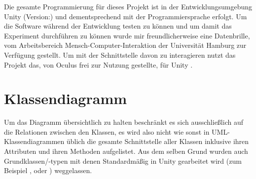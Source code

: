Die gesamte Programmierung für dieses Projekt ist in der Entwicklungsumgebung Unity (Version:) \cite{unity} und dementsprechend mit der Programmiersprache  erfolgt. Um die Software während der Entwicklung testen zu können und um damit das Experiment durchführen zu können wurde mir freundlicherweise eine  \cite{quest} Datenbrille, vom Arbeitsbereich Mensch-Computer-Interaktion der Universität Hamburg zur Verfügung gestellt. Um mit der Schnittstelle davon zu interagieren nutzt das Projekt das, von Oculus frei zur Nutzung gestellte,  für Unity \cite{integration}.


\section{Klassendiagramm}
Um das Diagramm übersichtlich zu halten beschränkt es sich
ausschließlich auf die Relationen zwischen den Klassen, es wird also nicht wie sonst in UML-Klassendiagrammen üblich die gesamte Schnittstelle aller Klassen inklusive ihren Attributen und ihren Methoden aufgelistet.
Aus dem selben Grund wurden auch Grundklassen/-typen mit denen Standardmäßig in Unity gearbeitet wird (zum Beispiel ,  oder ) weggelassen.


